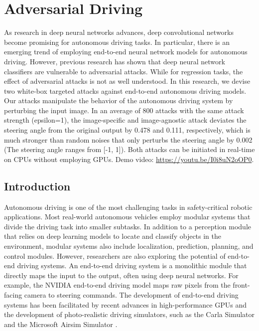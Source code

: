 \chapter{Adversarial Driving}
\label{chpt:driving}


As research in deep neural networks advances, deep convolutional networks become promising for autonomous driving tasks. In particular, there is an emerging trend of employing end-to-end neural network models for autonomous driving. However, previous research has shown that deep neural network classifiers are vulnerable to adversarial attacks. While for regression tasks, the effect of adversarial attacks is not as well understood. In this research, we devise two white-box targeted attacks against end-to-end autonomous driving models. Our attacks manipulate the behavior of the autonomous driving system by perturbing the input image. In an average of 800 attacks with the same attack strength (epsilon=1), the image-specific and image-agnostic attack deviates the steering angle from the original output by 0.478 and 0.111, respectively, which is much stronger than random noises that only perturbs the steering angle by 0.002 (The steering angle ranges from [-1, 1]). Both attacks can be initiated in real-time on CPUs without employing GPUs. Demo video: \href{https://youtu.be/I0i8uN2oOP0}{https://youtu.be/I0i8uN2oOP0}.


\section{Introduction}

Autonomous driving is one of the most challenging tasks in safety-critical robotic applications. Most real-world autonomous vehicles employ modular systems that divide the driving task into smaller subtasks. In addition to a perception module that relies on deep learning models to locate and classify objects in the environment, modular systems also include localization, prediction, planning, and control modules. However, researchers are also exploring the potential of end-to-end driving systems. An end-to-end driving system is a monolithic module that directly maps the input to the output, often using deep neural networks. For example, the NVIDIA end-to-end driving model \citep{bojarski2016end} maps raw pixels from the front-facing camera to steering commands. The development of end-to-end driving systems has been facilitated by recent advances in high-performance GPUs and the development of photo-realistic driving simulators, such as the Carla Simulator \citep{Dosovitskiy17} and the Microsoft Airsim Simulator \citep{airsim2017fsr}.  

